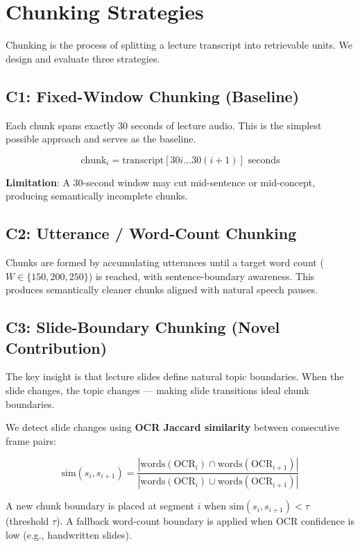 \documentclass[12pt,a4paper]{article}
\begin{document}
\newpage
\section{Chunking Strategies}
\label{sec:chunking}

Chunking is the process of splitting a lecture transcript into retrievable units. We design and evaluate three strategies.

\subsection{C1: Fixed-Window Chunking (Baseline)}

Each chunk spans exactly 30 seconds of lecture audio. This is the simplest possible approach and serves as the baseline.

\[
  \text{chunk}_i = \text{transcript}[30i \ldots 30(i+1)] \text{ seconds}
\]

\textbf{Limitation}: A 30-second window may cut mid-sentence or mid-concept, producing semantically incomplete chunks.

\subsection{C2: Utterance / Word-Count Chunking}

Chunks are formed by accumulating utterances until a target word count ($W \in \{150, 200, 250\}$) is reached, with sentence-boundary awareness. This produces semantically cleaner chunks aligned with natural speech pauses.

\subsection{C3: Slide-Boundary Chunking (Novel Contribution)}

The key insight is that lecture slides define natural topic boundaries. When the slide changes, the topic changes — making slide transitions ideal chunk boundaries.

We detect slide changes using \textbf{OCR Jaccard similarity} between consecutive frame pairs:

\[
  \text{sim}(s_i, s_{i+1}) = \frac{|\text{words}(\text{OCR}_i) \cap \text{words}(\text{OCR}_{i+1})|}{|\text{words}(\text{OCR}_i) \cup \text{words}(\text{OCR}_{i+1})|}
\]

A new chunk boundary is placed at segment $i$ when $\text{sim}(s_i, s_{i+1}) < \tau$ (threshold $\tau$). A fallback word-count boundary is applied when OCR confidence is low (e.g., handwritten slides).
\end{document}
